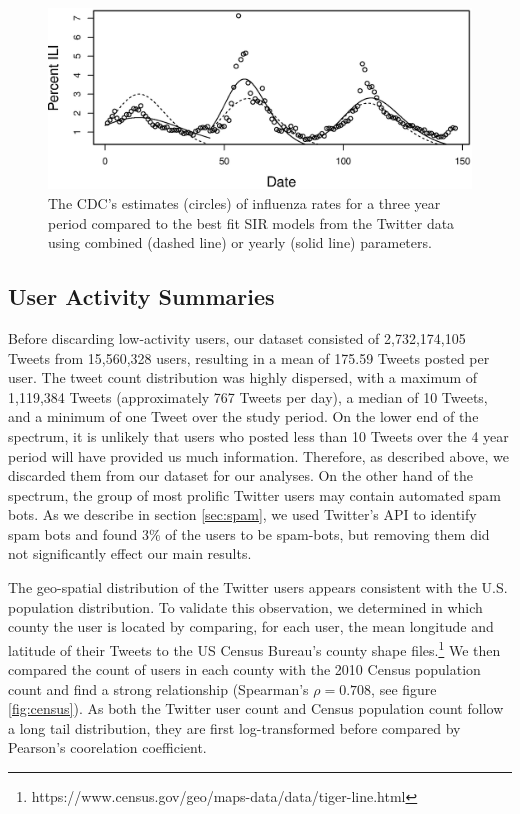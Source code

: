 \begin{figure}
\centering
\includegraphics[width=1.0\textwidth]{longitude/figs/sirCurve.eps}
\caption{The CDC's estimates (circles) of influenza rates for a three year period compared to the best fit SIR models from the Twitter data using combined (dashed line) or yearly (solid line) parameters.}
\label{fig:sirFit}
\end{figure}

\subsection{User Activity Summaries}

Before discarding low-activity users, our dataset consisted of 2,732,174,105 Tweets from 15,560,328 users, resulting in a mean of 175.59 Tweets posted per user. The tweet count distribution was highly dispersed, with a maximum of 1,119,384 Tweets  (approximately 767 Tweets per day), a median of 10 Tweets, and a minimum of one Tweet over the study period. On the lower end of the spectrum, it is unlikely that users who posted less than 10 Tweets over the 4 year period will have provided us much information. Therefore, as described above, we discarded them from our dataset for our analyses. On the other hand of the spectrum, the group of most prolific Twitter users may contain automated spam bots. As we describe in section \ref{sec:spam}, we used Twitter's API to identify spam bots and found 3\% of the users to be spam-bots, but removing them did not significantly effect our main results. 


The geo-spatial distribution of the Twitter users appears consistent with the U.S. population distribution. To validate this observation, we determined in which county the user is located by comparing, for each user, the mean longitude and latitude of their Tweets to the US Census Bureau's county shape files.\footnote{https://www.census.gov/geo/maps-data/data/tiger-line.html} We then compared the count of users in each county with the 2010 Census population count and find a strong relationship (Spearman's \(\rho = 0.708\), see figure \ref{fig:census}). As both the Twitter user count and Census population count follow a long tail distribution, they are first log-transformed before compared by Pearson's coorelation coefficient. 

